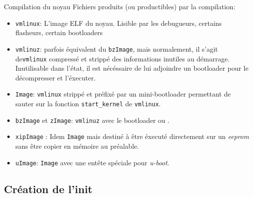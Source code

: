 \begin{frame}[fragile=singleslide]{Compilation du noyau}
  Fichiers produits (ou productibles) par la compilation:
  \begin{itemize}
  \item  \verb+vmlinux+:  L'image  ELF  du  noyau.   Lisible  par  les
    debugueurs, certains flasheurs, certain bootloaders
  \item  \verb+vmlinuz+: parfois  équivalent  du \verb+bzImage+,  mais
    normalement, il  s'agit de\verb+vmlinux+ compressé  et strippé des
    informations inutiles  au démarrage. Inutilisable  dans l'état, il
    est nécéssaire de lui adjoindre un bootloader pour le décompresser
    et l'éxecuter.
  \item  \verb+Image+:  \verb+vmlinux+   strippé  et  préfixé  par  un
    mini-bootloader   permettant    de   sauter   sur    la   fonction
    \verb+start_kernel+ de \verb+vmlinux+.
  \item  \verb+bzImage+  et   \verb+zImage+:  \verb+vmlinuz+  avec  le
    bootloader  ou .
  \item  \verb+xipImage+  :  Idem  \verb+Image+ mais  destiné  à  être
    éxecuté  directement  sur un  \emph{eeprom}  sans  être copier  en
    mémoire au préalable.
  \item  \verb+uImage+:  \verb+Image+ avec  une  entête spéciale  pour
    \emph{u-boot}.
  \end{itemize}
\end{frame}


\subsection{Création de l'init}


